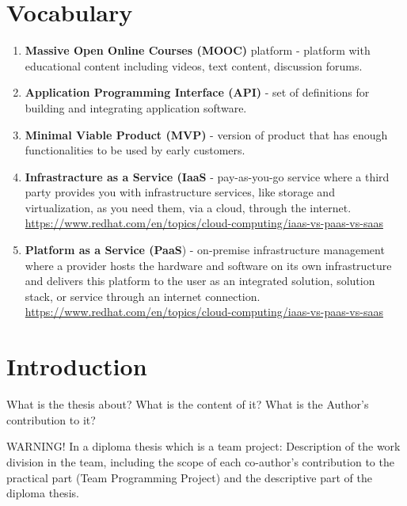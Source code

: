 \documentclass[a4paper,11pt,twoside]{report}
\theoremstyle{definition}
\begin{document}

\null\thispagestyle{empty}\newpage
\pagestyle{fancy}
\setcounter{page}{11}

\chapter*{Vocabulary}


\begin{enumerate}
\item \textbf{Massive Open Online Courses (MOOC)} platform - platform with educational content including videos, text content, discussion forums.
\item \textbf{Application Programming Interface (API)} - set of definitions for building and integrating application software.
\item \textbf{Minimal Viable Product (MVP)} - version of product that has enough functionalities to be used by early customers.
\item \textbf{Infrastracture as a Service (IaaS} - pay-as-you-go service where a third party provides you with infrastructure services, like storage and virtualization, as you need them, via a cloud, through the internet. \href{https://www.redhat.com/en/topics/cloud-computing/iaas-vs-paas-vs-saas}{https://www.redhat.com/en/topics/cloud-computing/iaas-vs-paas-vs-saas}
\item \textbf{Platform as a Service (PaaS}) - on-premise infrastructure management where a provider hosts the hardware and software on its own infrastructure and delivers this platform to the user as an integrated solution, solution stack, or service through an internet connection. \href{https://www.redhat.com/en/topics/cloud-computing/iaas-vs-paas-vs-saas}{https://www.redhat.com/en/topics/cloud-computing/iaas-vs-paas-vs-saas}
\end{enumerate}


\chapter*{Introduction}

What is the thesis about? What is the content of it? What is the Author's contribution to it?
\par
WARNING!  In a diploma thesis which is a team project: Description of the work division in the team, including the scope of each co-author’s contribution to the practical part (Team Programming Project) and the descriptive part of the diploma thesis. 
\par
\end{document}
